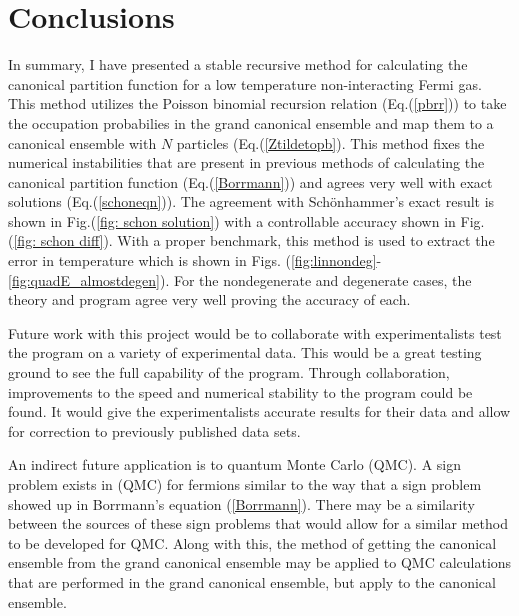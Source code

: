 \chapter{Conclusions} \label{ch:conclusion}
In summary, I have presented a stable recursive method for calculating the canonical partition function for a low temperature non-interacting Fermi gas. This method utilizes the Poisson binomial recursion relation (Eq.\@ (\ref{pbrr})) to take the occupation probabilies in the grand canonical ensemble and map them to a canonical ensemble with $N$ particles (Eq.\@(\ref{Ztildetopb}). This method fixes the numerical instabilities that are present in previous methods of calculating the canonical partition function (Eq.\@ (\ref{Borrmann})) and agrees very well with exact solutions (Eq.\@ (\ref{schoneqn})). The agreement with Sch\"onhammer's exact result is shown in Fig.\@ (\ref{fig: schon solution}) with a controllable accuracy shown in Fig.\@ (\ref{fig: schon diff}). With a proper benchmark, this method is used to extract the error in temperature which is shown in Figs. (\ref{fig:linnondeg}-\ref{fig:quadE_almostdegen}). For the nondegenerate and degenerate cases, the theory and program agree very well proving the accuracy of each. 

Future work with this project would be to collaborate with experimentalists test the program on a variety of experimental data. This would be a great testing ground to see the full capability of the program. Through collaboration, improvements to the speed and numerical stability to the program could be found. It would give the experimentalists accurate results for their data and allow for correction to previously published data sets.

An indirect future application is to quantum Monte Carlo (QMC). A sign problem exists in (QMC) for fermions similar to the way that a sign problem showed up in Borrmann's equation (\ref{Borrmann}). There may be a similarity between the sources of these sign problems that would allow for a similar method to be developed for QMC. Along with this, the method of getting the canonical ensemble from the grand canonical ensemble may be applied to QMC calculations that are performed in the grand canonical ensemble, but apply to the canonical ensemble. 